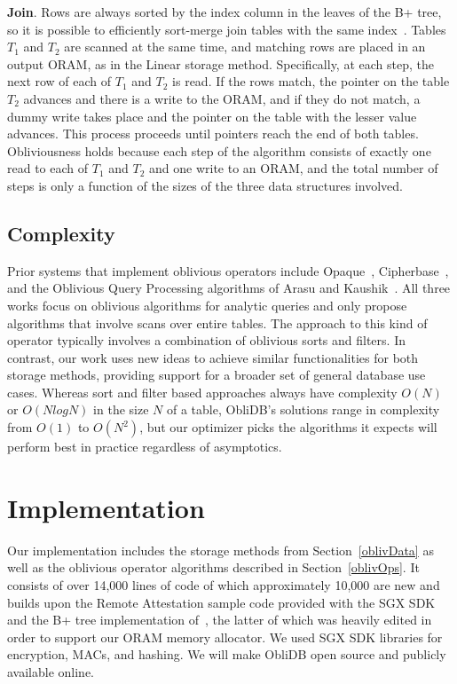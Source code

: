 \documentclass[letterpaper,twocolumn,10pt]{article}
\def\name/{ObliDB}
\begin{document}
  \noindent \textbf{Join}.
  Rows are always sorted by the index column in the leaves of the B+ tree, so it is possible to efficiently sort-merge join tables with the same index~\cite{EN10}. Tables $T_1$ and $T_2$ are scanned at the same time, and matching rows are placed in an output ORAM, as in the Linear storage method. Specifically, at each step, the next row of each of $T_1$ and $T_2$ is read. If the rows match, the pointer on the table $T_2$ advances and there is a write to the ORAM, and if they do not match, a dummy write takes place and the pointer on the table with the lesser value advances. This process proceeds until pointers reach the end of both tables. Obliviousness holds because each step of the algorithm consists of exactly one read to each of $T_1$ and $T_2$ and one write to an ORAM, and the total number of steps is only a function of the sizes of the three data structures involved.

\subsection{Complexity}
Prior systems that implement oblivious operators include Opaque~\cite{ZDB+17}, Cipherbase~\cite{cipherbase}, and the Oblivious Query Processing algorithms of Arasu and Kaushik~\cite{AK14}. All three works focus on oblivious algorithms for analytic queries and only propose algorithms that involve scans over entire tables. The approach to this kind of operator typically involves a combination of oblivious sorts and filters. In contrast, our work uses new ideas to achieve similar functionalities for both storage methods, providing support for a broader set of general database use cases. Whereas sort and filter based approaches always have complexity $O(N)$ or $O(N\textit{log}N)$ in the size $N$ of a table, \name/'s solutions range in complexity from $O(1)$ to $O(N^2)$, but our optimizer picks the algorithms it expects will perform best in practice regardless of asymptotics.

\section{Implementation}\label{imp}
Our implementation includes the storage methods from Section~\ref{oblivData} as well as the oblivious operator algorithms described in Section~\ref{oblivOps}. It consists of over 14,000 lines of code of which approximately 10,000 are new and builds upon the Remote Attestation sample code provided with the SGX SDK ~\cite{SGXRef} and the B+ tree implementation of~\cite{BPlus}, the latter of which was heavily edited in order to support our ORAM memory allocator. We used SGX SDK libraries for encryption, MACs, and hashing. We will make \name/ open source and publicly available online.
\end{document}
